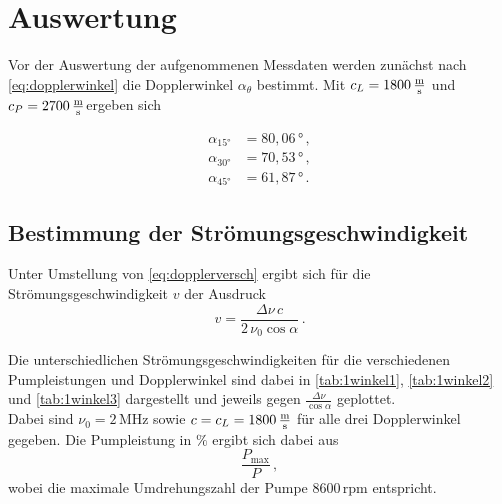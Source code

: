 \section{Auswertung}
\label{sec:auswertung}

Vor der Auswertung der aufgenommenen Messdaten werden zunächst nach \eqref{eq:dopplerwinkel} die Dopplerwinkel $\alpha_\theta$ bestimmt.
Mit $c_L = 1800 \,\unit{\frac{\meter}{\second}}$ und $c_P = 2700 \,\unit{\frac{\meter}{\second}}$ergeben sich

\begin{align*}
    \alpha_{15°} &= 80,06 \,° \,,\\
    \alpha_{30°} &= 70,53 \,° \,,\\
    \alpha_{45°} &= 61,87 \,° \,. 
\end{align*}

\subsection{Bestimmung der Strömungsgeschwindigkeit}

Unter Umstellung von \eqref{eq:dopplerversch} ergibt sich für die Strömungsgeschwindigkeit $v$ der Ausdruck
\begin{equation}
    v = \frac{\Delta\nu \,c}{2 \,\nu_0 \cos\alpha} \,.
    \label{eq:momgeschwi}
\end{equation}

Die unterschiedlichen Strömungsgeschwindigkeiten für die verschiedenen Pumpleistungen und Dopplerwinkel sind dabei in \autoref{tab:1winkel1}, \autoref{tab:1winkel2} und \autoref{tab:1winkel3} dargestellt und jeweils gegen  
$\frac{\Delta\nu}{\cos\alpha}$ geplottet. \\

Dabei sind $\nu_0 = 2 \,\unit{\mega\hertz}$ sowie $c = c_L = 1800 \,\unit{\frac{\meter}{\second}}$ für alle drei Dopplerwinkel gegeben.
Die Pumpleistung in $\%$ ergibt sich dabei aus
\begin{equation*}
    \frac{P_{\text{max}}}{P} \,,
\end{equation*}
wobei die maximale Umdrehungszahl der Pumpe $8600 \, \text{rpm}$ entspricht. \\


